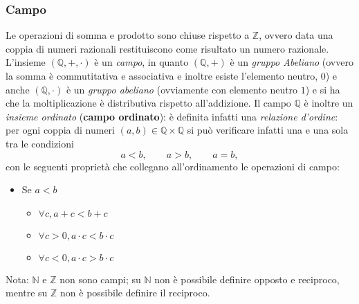 \documentclass[a4paper,12pt, oneside]{book}
\begin{document}
\subsubsection{Campo}
Le operazioni di somma e prodotto sono chiuse rispetto a  $\mathbb{Z}$, ovvero data una coppia di numeri razionali restituiscono come risultato un numero razionale.\\
L'insieme $(\mathbb{Q},+,\cdot)$ è un \textit{campo}, in quanto $(\mathbb{Q},+)$ è un \textit{gruppo Abeliano} (ovvero la somma è commutitativa e associativa e inoltre esiste l'elemento neutro, $0$) e anche $(\mathbb{Q},\cdot)$ è un \textit{gruppo abeliano} (ovviamente con elemento neutro $1$) e si ha che la moltiplicazione è distributiva rispetto all'addizione.
Il campo $\mathbb{Q}$ è inoltre un \textit{insieme ordinato} (\textbf{campo ordinato}): è definita infatti una \textit{relazione d'ordine}: per ogni coppia di numeri $(a,b)\in\mathbb{Q}\times\mathbb{Q}$ si può verificare infatti una e una sola tra le condizioni
$$a<b,\qquad a>b,\qquad a=b,$$
con le seguenti proprietà che collegano all'ordinamento le operazioni di campo:
\begin{itemize}
	\item Se $a<b$
	\begin{itemize}
		\item $\forall c, a+c<b+c$
		\item $\forall c>0, a\cdot c<b\cdot c$
		\item $\forall c<0, a\cdot c>b\cdot c$
	\end{itemize}
\end{itemize}
Nota: $\mathbb{N}$ e $\mathbb{Z}$ non sono campi; su $\mathbb{N}$ non è possibile definire opposto e reciproco, mentre su $\mathbb{Z}$ non è possibile definire il reciproco.
\end{document}
